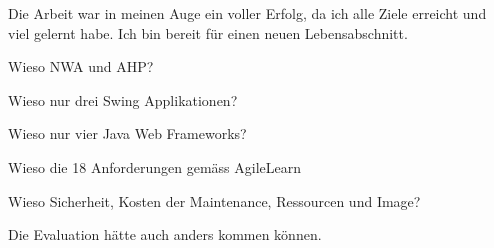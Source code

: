   Die Arbeit war in meinen Auge ein voller Erfolg, da ich alle Ziele erreicht
  und viel gelernt habe. Ich bin bereit für einen neuen Lebensabschnitt.

  Wieso NWA und AHP?

  Wieso nur drei Swing Applikationen?
  
  Wieso nur vier Java Web Frameworks?
  
  Wieso die 18 Anforderungen gemäss AgileLearn
  
  Wieso Sicherheit, Kosten der Maintenance, Ressourcen und Image?
  
  Die Evaluation hätte auch anders kommen können.